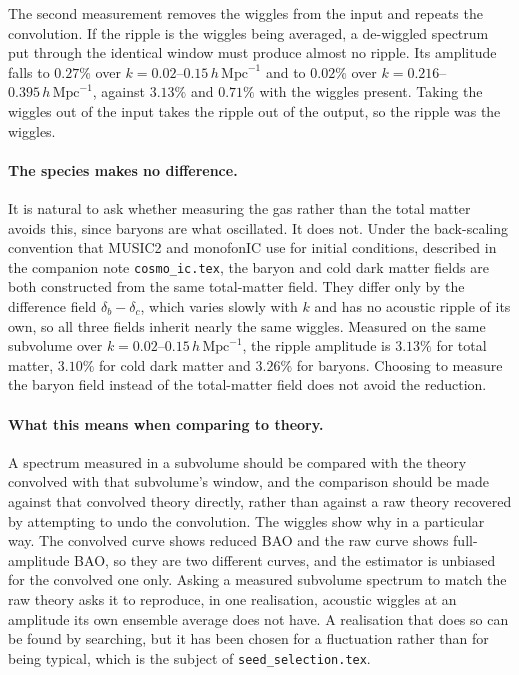 \documentclass[12pt]{article}
\begin{document}
The second measurement removes the wiggles from the input and repeats the
convolution.  If the ripple is the wiggles being averaged, a de-wiggled
spectrum put through the identical window must produce almost no ripple.
Its amplitude falls to $0.27\%$ over $k = 0.02$--$0.15\,h\,\mathrm{Mpc}^{-1}$
and to $0.02\%$ over $k = 0.216$--$0.395\,h\,\mathrm{Mpc}^{-1}$, against
$3.13\%$ and $0.71\%$ with the wiggles present.  Taking the wiggles out of
the input takes the ripple out of the output, so the ripple was the wiggles.

\paragraph{The species makes no difference.}
It is natural to ask whether measuring the gas rather than the total matter
avoids this, since baryons are what oscillated.  It does not.  Under the
back-scaling convention that MUSIC2 and monofonIC use for initial
conditions, described in the companion note \texttt{cosmo\_ic.tex}, the
baryon and cold dark matter fields are both constructed from the same
total-matter field.  They differ only by the difference field
$\delta_b - \delta_c$, which varies slowly with $k$ and has no acoustic
ripple of its own, so all three fields inherit nearly the same wiggles.
Measured on the same subvolume over
$k = 0.02$--$0.15\,h\,\mathrm{Mpc}^{-1}$, the ripple amplitude is $3.13\%$
for total matter, $3.10\%$ for cold dark matter and $3.26\%$ for baryons.
Choosing to measure the baryon field instead of the total-matter field does
not avoid the reduction.

\paragraph{What this means when comparing to theory.}
A spectrum measured in a subvolume should be compared with the theory
convolved with that subvolume's window, and the comparison should be made
against that convolved theory directly, rather than against a raw theory
recovered by attempting to undo the convolution.  The wiggles show why in a
particular way.  The convolved curve shows reduced BAO and the raw curve
shows full-amplitude BAO, so they are two different curves, and the
estimator is unbiased for the convolved one only.  Asking a measured
subvolume spectrum to match the raw theory asks it to reproduce, in one
realisation, acoustic wiggles at an amplitude its own ensemble average does
not have.  A realisation that does so can be found by searching, but it has
been chosen for a fluctuation rather than for being typical, which is the
subject of \texttt{seed\_selection.tex}.
\end{document}
